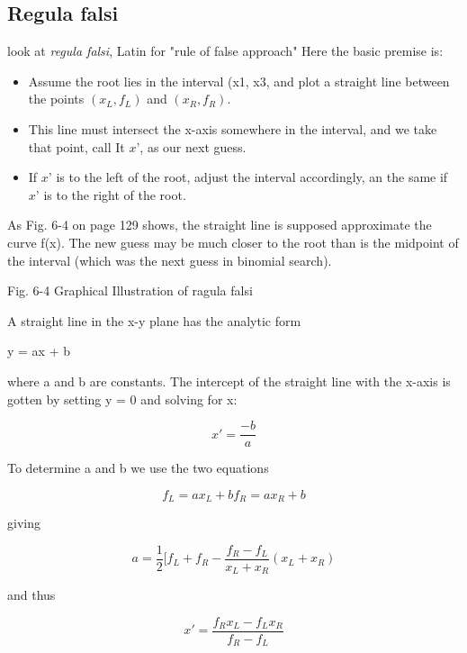 \subsection{Regula falsi}

 look at \textit{regula falsi}, Latin for "rule of false approach" Here the basic premise is:

\begin{itemize}
    \item Assume the root lies in the interval (x1, x3, and plot a straight line between the points $(x_L, f_L)$ and $(x_R, f_R)$.

    \item This line must intersect the x-axis somewhere in the interval, and we take that point, call It $x’$, as our next guess.

    \item If $x’$ is to the left of the root, adjust the interval accordingly, an the same if $x’$ is to the right of the root.
\end{itemize}

As Fig. 6-4 on page 129 shows, the straight line is supposed
approximate the curve f(x). The new guess may be much closer to the root than is the midpoint of the interval (which was the next guess in binomial search).

Fig. 6-4 Graphical Illustration of ragula falsi

A straight line in the x-y plane has the analytic form

y = ax + b

where a and b are constants. The intercept of the straight line with the x-axis is gotten by setting y = 0 and solving for x:

\begin{equation}
x' = \frac{-b}{a}
\end{equation}

To determine a and b we use the two equations

\begin{equation}
f_L = ax_L + b
f_R = ax_R + b
\end{equation}

giving

\begin{equation}
a = \frac{1}{2}[f_L + f_R - \frac{f_R - f_L}{x_L + x_R} (x_L + x_R)
\end{equation}

and thus

\begin{equation}
x' = \frac{f_Rx_L - f_Lx_R}{f_R - f_L}
\end{equation}

